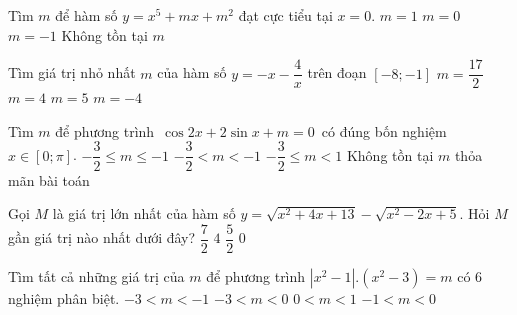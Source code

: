 \begin{ex}%
	Tìm  $m$ để hàm số $y=x^5+mx+m^2$ đạt cực tiểu tại $x=0$.
	\choice
	{$m=1$}
	{$m=0$}
	{$m=-1$}
	{\True  Không tồn tại $m$}
\end{ex}
\begin{ex}%
	Tìm giá trị nhỏ nhất $m$ của hàm số $y=-x-\dfrac{4}{x}$ trên đoạn $[-8;-1]$
	\choice
	{$m=\dfrac{17}{2}$}
	{\True $m=4$}
	{$m=5$}
	{$m=-4$}
\end{ex}

\begin{ex}%
	Tìm $m$ để phương trình\ $\cos 2x+2\sin x+m=0$\ có đúng bốn nghiệm $x\in[0;\pi]$.
	\choice
	{$-\dfrac{3}{2}\leq m\leq -1$}
	{\True $-\dfrac{3}{2}<m<-1$}
	{$-\dfrac{3}{2}\leq m<1$}
	{Không tồn tại $m$ thỏa mãn bài toán}
\end{ex}


\begin{ex}%
	Gọi $M$ là giá trị lớn nhất của hàm số $y=\sqrt{x^2+4x+13}-\sqrt{x^2-2x+5}$. Hỏi $M$ gần giá trị nào nhất dưới đây?
	\choice
	{\True $\dfrac{7}{2}$}
	{$4$}
	{$\dfrac{5}{2}$}
	{$0$}
\end{ex}

\begin{ex}%
\end{ex}

\begin{ex}%
	Tìm tất cả những giá trị của $m$ để phương trình $|x^2-1|.(x^2-3)=m$ có 6 nghiệm phân biệt. 
	\choice
	{$-3<m<-1$}
	{$-3<m<0$}
	{$0<m<1$}
	{\True  $-1<m<0$}
\end{ex}

